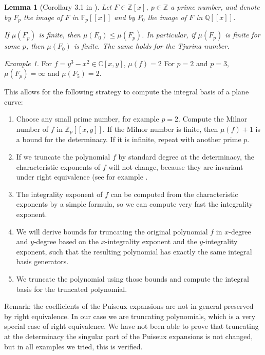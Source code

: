 \documentclass[a4paper,11pt,reqno]{amsart}%
\theoremstyle{definition}
\theoremstyle{plain}
\newtheorem{lemma}[definition]{Lemma}
\theoremstyle{remark}
\newtheorem{example}[definition]{Example}
\newcommand{\Z}{{\mathbb Z}}
\newcommand{\C}{{\mathbb C}}
\begin{document}
\begin{lemma}[Corollary 3.1 in \cite{Greuel2021}]
Let \( F \in \mathbb{Z}[x] \), \( p \in \mathbb{Z} \) a prime number, and denote by \( F_p \) the image
of \( F \) in \( \mathbb{F}_p[[x]] \) and by \( F_0 \) the image of \( F \) in \( \mathbb{Q}[[x]] \).

If \( \mu(F_p) \) is finite, then \( \mu(F_0) \leq \mu(F_p) \). In particular, if \( \mu(F_p) \) is finite for some \( p \), then \( \mu(F_0) \)
    is finite. The same holds for the Tjurina number.
\end{lemma}


\begin{example}
For $f = y^3 - x^2 \in \C[x,y]$, $\mu(f) = 2$ For $p = 2$ and $p = 3$, $\mu(F_p) = \infty$ and $\mu(F_5) = 2$.
\end{example}

This allows for the following strategy to compute the integral basis of a plane curve:
\begin{enumerate}
\item Choose any small prime number, for example $p = 2$. Compute the Milnor number of $f$ in $\Z_p[[x,y]]$. If the Milnor number is finite, then $\mu(f) + 1$ is a bound for the determinacy. If it is infinite, repeat with another prime $p$.
\item If we truncate the polynomial $f$ by standard degree at the determinacy, the characteristic exponents of $f$ will not change, because they are invariant under right equivalence (see for example \cite[Section 5.2]{de2013local}.
\item The integrality exponent of $f$ can be computed from the characteristic exponents by a simple formula, so we can compute very fast the integrality exponent.
\item We will derive bounds for truncating the original polynomial $f$ in $x$-degree and $y$-degree based on the $x$-integrality exponent and the $y$-integrality exponent, such that the resulting polynomial has exactly the same integral basis generators.
\item We truncate the polynomial using those bounds and compute the integral basis for the truncated polynomial.
\end{enumerate}

Remark: the coefficients of the Puiseux expansions are not in general preserved by right equivalence. In our case we are truncating polynomials, which is a very special case of right equivalence. We have not been able to prove that truncating at the determinacy the singular part of the Puiseux expansions is not changed, but in all examples we tried, this is verified.
\end{document}

